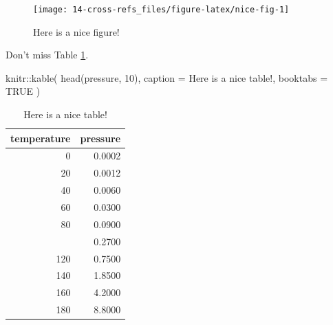 \documentclass[
]{book}
\newenvironment{Shaded}{\begin{snugshade}}{\end{snugshade}}
\newcommand{\AttributeTok}[1]{\textcolor[rgb]{0.77,0.63,0.00}{#1}}
\newcommand{\ConstantTok}[1]{\textcolor[rgb]{0.00,0.00,0.00}{#1}}
\newcommand{\DecValTok}[1]{\textcolor[rgb]{0.00,0.00,0.81}{#1}}
\newcommand{\FunctionTok}[1]{\textcolor[rgb]{0.00,0.00,0.00}{#1}}
\newcommand{\NormalTok}[1]{#1}
\newcommand{\SpecialCharTok}[1]{\textcolor[rgb]{0.00,0.00,0.00}{#1}}
\newcommand{\StringTok}[1]{\textcolor[rgb]{0.31,0.60,0.02}{#1}}
\theoremstyle{definition}
\theoremstyle{definition}
\theoremstyle{definition}
\theoremstyle{definition}
\theoremstyle{remark}
\begin{document}
\begin{figure}

{\centering \texttt{[image: 14-cross-refs\_files/figure-latex/nice-fig-1]} 

}

\caption{Here is a nice figure!}\label{fig:nice-fig}
\end{figure}

Don't miss Table \ref{tab:nice-tab}.

\begin{Shaded}
\begin{Highlighting}[]
\NormalTok{knitr}\SpecialCharTok{::}\FunctionTok{kable}\NormalTok{(}
  \FunctionTok{head}\NormalTok{(pressure, }\DecValTok{10}\NormalTok{), }\AttributeTok{caption =} \StringTok{\textquotesingle{}Here is a nice table!\textquotesingle{}}\NormalTok{,}
  \AttributeTok{booktabs =} \ConstantTok{TRUE}
\NormalTok{)}
\end{Highlighting}
\end{Shaded}

\begin{table}

\caption{\label{tab:nice-tab}Here is a nice table!}
\centering
\begin{tabular}[t]{rr}
\toprule
temperature & pressure\\
\midrule
0 & 0.0002\\
20 & 0.0012\\
40 & 0.0060\\
60 & 0.0300\\
80 & 0.0900\\
\addlinespace
100 & 0.2700\\
120 & 0.7500\\
140 & 1.8500\\
160 & 4.2000\\
180 & 8.8000\\
\bottomrule
\end{tabular}
\end{table}

  
\end{document}
